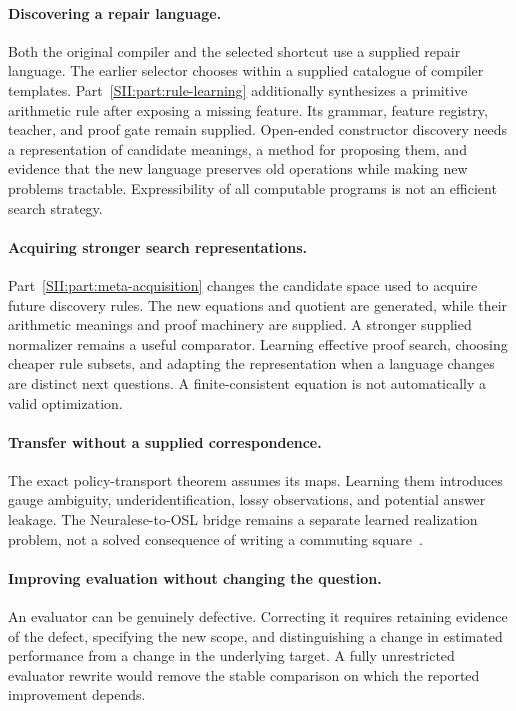 \paragraph{Discovering a repair language.}
Both the original compiler and the selected shortcut use a supplied repair language. The earlier selector chooses within a supplied catalogue of compiler templates. Part~\ref{SII:part:rule-learning} additionally synthesizes a primitive arithmetic rule after exposing a missing feature. Its grammar, feature registry, teacher, and proof gate remain supplied. Open-ended constructor discovery needs a representation of candidate meanings, a method for proposing them, and evidence that the new language preserves old operations while making new problems tractable. Expressibility of all computable programs is not an efficient search strategy.

\paragraph{Acquiring stronger search representations.}
Part~\ref{SII:part:meta-acquisition} changes the candidate space used to acquire future discovery rules. The new equations and quotient are generated, while their arithmetic meanings and proof machinery are supplied. A stronger supplied normalizer remains a useful comparator. Learning effective proof search, choosing cheaper rule subsets, and adapting the representation when a language changes are distinct next questions. A finite-consistent equation is not automatically a valid optimization.

\paragraph{Transfer without a supplied correspondence.}
The exact policy-transport theorem assumes its maps. Learning them introduces gauge ambiguity, underidentification, lossy observations, and potential answer leakage. The Neuralese-to-OSL bridge remains a separate learned realization problem, not a solved consequence of writing a commuting square~\cite{SII:neuralese}.

\paragraph{Improving evaluation without changing the question.}
An evaluator can be genuinely defective. Correcting it requires retaining evidence of the defect, specifying the new scope, and distinguishing a change in estimated performance from a change in the underlying target. A fully unrestricted evaluator rewrite would remove the stable comparison on which the reported improvement depends.

